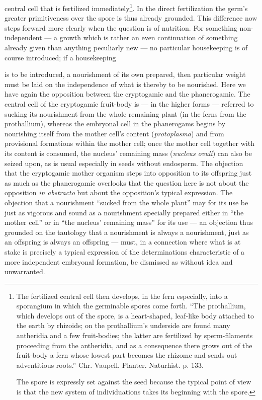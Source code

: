 \documentclass[12pt,a4paper]{book}
\begin{document}
\setcounter{footnote}{0}
central cell that is fertilized immediately\footnote{The fertilized central cell
then develops, in the fern especially, into a sporangium in which the germinable
spores come forth. ``The prothallium, which develops out of the spore, is a
heart-shaped, leaf-like body attached to the earth by rhizoids; on the
prothallium's underside are found many antheridia and a few fruit-bodies; the
latter are fertilized by sperm-filaments proceeding from the antheridia, and as a
consequence there grows out of the fruit-body a fern whose lowest part becomes the
rhizome and sends out adventitious roots.'' Chr. Vaupell. Planter. Naturhist.
p. 133.

The spore is expressly set against the seed because the typical point of view is
that the new system of individuations takes its beginning with the spore.}. In the
direct fertilization the germ's greater primitiveness over the spore is thus
already grounded. This difference now steps forward more clearly when the question
is of nutrition. For something non-independent --- a growth which is rather an
even continuation of something already given than anything peculiarly new --- no
particular housekeeping is of course introduced; if a housekeeping

is to be introduced, a nourishment of its own prepared, then particular weight
must be laid on the independence of what is thereby to be nourished. Here we have
again the opposition between the cryptogamic and the phanerogamic. The central
cell of the cryptogamic fruit-body is --- in the higher forms --- referred to
sucking its nourishment from the whole remaining plant (in the ferns from the
prothallium), whereas the embryonal cell in the phanerogams begins by nourishing
itself from the mother cell's content (\textit{protoplasma}) and from provisional
formations within the mother cell; once the mother cell together with its content
is consumed, the nucleus' remaining mass (\textit{nucleus ovuli}) can also be
seized upon, as is usual especially in seeds without endosperm. The objection that
the cryptogamic mother organism steps into opposition to its offspring just as much
as the phanerogamic overlooks that the question here is not about the opposition
\textit{in abstracto} but about the opposition's typical expression. The objection
that a nourishment ``sucked from the whole plant'' may for its use be just as
vigorous and sound as a nourishment specially prepared either in ``the mother
cell'' or in ``the nucleus' remaining mass'' for its use --- an objection thus
grounded on the tautology that a nourishment is always a nourishment, just as an
offspring is always an offspring --- must, in a connection where what is at stake
is precisely a typical expression of the determinations characteristic of a more
independent embryonal formation, be dismissed as without idea and unwarranted.
\end{document}
